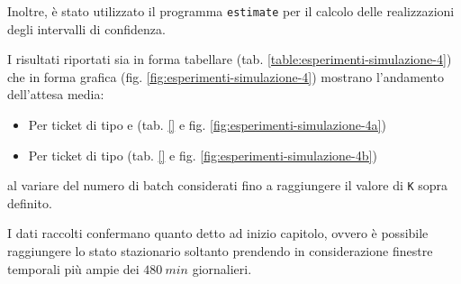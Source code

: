 Inoltre, è stato utilizzato il programma \texttt{estimate} per il calcolo delle realizzazioni degli intervalli di confidenza.

I risultati riportati sia in forma tabellare (tab. \ref{table:esperimenti-simulazione-4}) che in forma grafica (fig. \ref{fig:esperimenti-simulazione-4}) mostrano l'andamento dell'attesa media:
\begin{itemize}
\item Per ticket di tipo \uo{} e \pp{} (tab. \ref{} e fig. \ref{fig:esperimenti-simulazione-4a})
\item Per ticket di tipo \sr{} (tab. \ref{} e fig. \ref{fig:esperimenti-simulazione-4b})
\end{itemize}
al variare del numero di batch considerati fino a raggiungere il valore di \texttt{K} sopra definito.

I dati raccolti confermano quanto detto ad inizio capitolo, ovvero è possibile raggiungere lo stato stazionario soltanto prendendo in considerazione finestre temporali più ampie dei $480\ min$ giornalieri.

